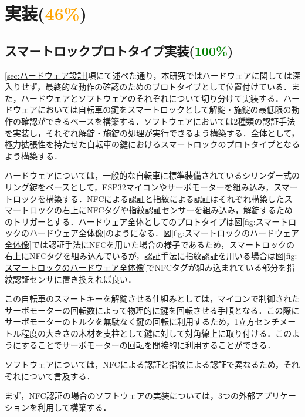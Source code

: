 \section{実装(\textcolor{orange}{46\%})}
  \label{sec:実装}
    \par
  
  \subsection{スマートロックプロトタイプ実装(\textcolor{green}{100\%})}
    \label{sec:スマートロックプロトタイプ実装}
      \par \ref{sec:ハードウェア設計}項にて述べた通り，本研究ではハードウェアに関しては深入りせず，最終的な動作の確認のためのプロトタイプとして位置付けている．また，ハードウェアとソフトウェアのそれぞれについて切り分けて実装する．ハードウェアにおいては自転車の鍵をスマートロックとして解錠・施錠の最低限の動作の確認ができるベースを構築する．ソフトウェアにおいては2種類の認証手法を実装し，それぞれ解錠・施錠の処理が実行できるよう構築する．全体として，極力拡張性を持たせた自転車の鍵におけるスマートロックのプロトタイプとなるよう構築する．
      \par ハードウェアについては，一般的な自転車に標準装備されているシリンダー式のリング錠をベースとして，ESP32マイコンやサーボモーターを組み込み，スマートロックを構築する．NFCによる認証と指紋による認証はそれぞれ構築したスマートロックの右上にNFCタグや指紋認証センサーを組み込み，解錠するためのトリガーとする．ハードウェア全体としてのプロトタイプは図\ref{fig:スマートロックのハードウェア全体像}のようになる．図\ref{fig:スマートロックのハードウェア全体像}では認証手法にNFCを用いた場合の様子であるため，スマートロックの右上にNFCタグを組み込んでいるが，認証手法に指紋認証を用いる場合は図\ref{fig:スマートロックのハードウェア全体像}でNFCタグが組み込まれている部分を指紋認証センサに置き換えれば良い．
      \par この自転車のスマートキーを解錠させる仕組みとしては，マイコンで制御されたサーボモーターの回転数によって物理的に鍵を回転させる手順となる．この際にサーボモーターのトルクを無駄なく鍵の回転に利用するため，1立方センチメートル程度の大きさの木材を支柱として鍵に対して対角線上に取り付ける．このようにすることでサーボモーターの回転を間接的に利用することができる．
      \par ソフトウェアについては，NFCによる認証と指紋による認証で異なるため，それぞれについて言及する．
      \par まず，NFC認証の場合のソフトウェアの実装については，3つの外部アプリケーションを利用して構築する．
